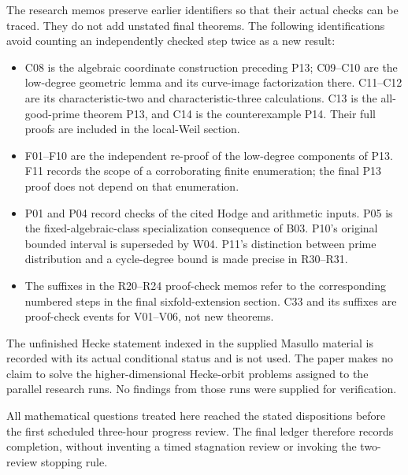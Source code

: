 The research memos preserve earlier identifiers so that their actual
checks can be traced. They do not add unstated final theorems. The
following identifications avoid counting an independently checked step
twice as a new result:
\begin{itemize}
\item C08 is the algebraic coordinate construction preceding P13;
C09--C10 are the low-degree geometric lemma and its curve-image
factorization there. C11--C12 are its characteristic-two and
characteristic-three calculations. C13 is the all-good-prime theorem
P13, and C14 is the counterexample P14. Their full proofs are included
in the local-Weil section.
\item F01--F10 are the independent re-proof of the low-degree
components of P13. F11 records the scope of a corroborating finite
enumeration; the final P13 proof does not depend on that enumeration.
\item P01 and P04 record checks of the cited Hodge and arithmetic
inputs. P05 is the fixed-algebraic-class specialization consequence of
B03. P10's original bounded interval is superseded by W04. P11's
distinction between prime distribution and a cycle-degree bound is
made precise in R30--R31.
\item The suffixes in the R20--R24 proof-check memos refer to the
corresponding numbered steps in the final sixfold-extension section.
C33 and its suffixes are proof-check events for V01--V06, not new
theorems.
\end{itemize}

The unfinished Hecke statement indexed in the supplied Masullo material
is recorded with its actual conditional status and is not used. The
paper makes no claim to solve the higher-dimensional Hecke-orbit problems
assigned to the parallel research runs. No findings from those runs
were supplied for verification.

All mathematical questions treated here reached the stated dispositions
before the first scheduled three-hour progress review. The final ledger
therefore records completion, without inventing a timed stagnation review
or invoking the two-review stopping rule.
